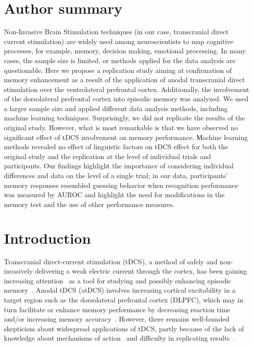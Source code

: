 \documentclass[10pt,letterpaper]{article}
\begin{document}
\section*{Author summary}
Non-Invasive Brain Stimulation techniques (in our case, transcranial direct current stimulation) are widely used among neuroscientists to map cognitive processes, for example, memory, decision making, emotional processing. In many cases, the sample size is limited, or methods applied for the data analysis are questionable. Here we propose a replication study aiming at confirmation of memory enhancement as a result of the application of anodal transcranial direct stimulation over the ventrolateral prefrontal cortex. Additionally, the involvement of the dorsolateral prefrontal cortex into episodic memory was analyzed. We used a larger sample size and applied different data analysis methods, including machine learning techniques. Surprisingly, we did not replicate the results of the original study. However, what is most remarkable is that we have observed no significant effect of tDCS involvement on memory performance.
Мachine learning methods revealed no effect of linguistic factors on tDCS effect for both the original study and the replication at the level of individual trials and participants. Our findings highlight the importance of considering individual differences and data on the level of a single trial; in our data, participants’ memory responses resembled guessing behavior when recognition performance was measured by AUROC and highlight the need for modifications in the memory test and the use of other performance measures.

\linenumbers

\section{Introduction}
Transcranial direct-current stimulation (tDCS), a method of safely and non-invasively delivering a weak electric current through the cortex, has been gaining increasing
attention~\cite{polania2018studying} as a tool for studying and possibly enhancing episodic memory~\cite{galli2019systematic}. Anodal tDCS (atDCS) involves increasing cortical excitability in a target region such as the dorsolateral prefrontal cortex (DLPFC), which may in turn facilitate or enhance memory        performance by decreasing reaction time and/or increasing memory accuracy~\cite{floel2004prefrontal, jacobson2012oppositional, leach2019differential, manenti2013enhancing, lafontaine2013transcranial, javadi2013transcranial, javadi2012transcranial}. However, there remains well-founded skepticism about widespread applications of tDCS, partly
because of the lack of knowledge about mechanisms of action~\cite{giordano2017mechanisms} and difficulty in
replicating results~\cite{heroux2017questionable}.
\end{document}
